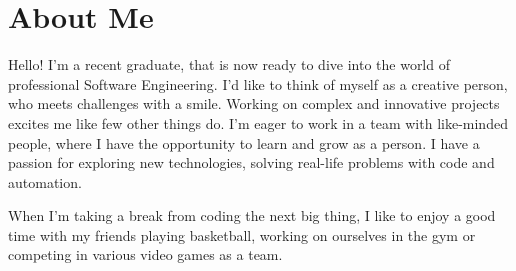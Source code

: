 \documentclass[]{resume}
\begin{document}
\begin{minipage}[t]{0.64\textwidth} 
\section{About Me}
Hello! I'm a recent graduate, that is now ready to dive into the world of professional Software Engineering. I'd like to think of myself as a creative person, who meets challenges with a smile. Working on complex and innovative projects excites me like few other things do. I'm eager to work in a team with like-minded people, where I have the opportunity to learn and grow as a person. I have a passion for exploring new technologies, solving real-life problems with code and automation.

When I'm taking a break from coding the next big thing, I like to enjoy a good time with my friends playing basketball, working on ourselves in the gym or competing in various video games as a team.
\sectionsep


\end{minipage}
\end{document}
